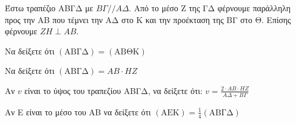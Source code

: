 Έστω τραπέζιο ΑΒΓΔ με $B\Gamma // A\Delta$. Από το μέσο Ζ της ΓΔ φέρνουμε παράλληλη προς την ΑΒ που τέμνει την ΑΔ στο Κ και την προέκταση της ΒΓ στο Θ. Επίσης φέρνουμε $ZH \perp AB$.
\begin{alist}
\item Να δείξετε ότι $(\text{ΑΒΓΔ}) = (\text{ΑΒΘΚ})$ 
\item Να δείξετε ότι $(\text{ΑΒΓΔ}) = AB \cdot HZ$ 
\item Αν $v$ είναι το ύψος του τραπεζίου ΑΒΓΔ, να δείξετε ότι: $v = \frac{2 \cdot AB \cdot HZ}{A\Delta+B\Gamma}$ 
\item Αν Ε είναι το μέσο του ΑΒ να δείξετε ότι $(\text{ΑΕΚ}) = \frac{1}{4} (\text{ΑΒΓΔ})$ 
\end{alist}